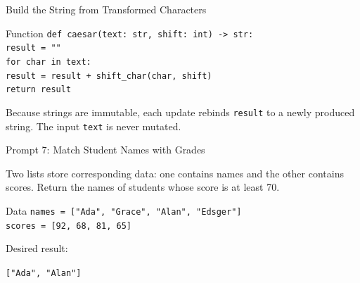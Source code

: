 \documentclass[aspectratio=169,10pt]{beamer}
\begin{document}
\begin{frame}{Build the String from Transformed Characters}
  \begin{block}{Function}
    \texttt{def caesar(text: str, shift: int) -> str:}\\
    \hspace*{0.20in}\texttt{result = ""}\\
    \hspace*{0.20in}\texttt{for char in text:}\\
    \hspace*{0.40in}\texttt{result = result + shift\_char(char, shift)}\\
    \hspace*{0.20in}\texttt{return result}
  \end{block}

  \begin{keyidea}
    Because strings are immutable, each update rebinds \texttt{result} to a newly produced string. The input \texttt{text} is never mutated.
  \end{keyidea}
\end{frame}


\begin{frame}{Prompt 7: Match Student Names with Grades}
  \begin{activity}
    Two lists store corresponding data: one contains names and the other contains scores. Return the names of students whose score is at least 70.
  \end{activity}

  \begin{block}{Data}
    \texttt{names  = ["Ada", "Grace", "Alan", "Edsger"]}\\
    \texttt{scores = [92, 68, 81, 65]}
  \end{block}

  Desired result:
  \begin{center}
    \texttt{["Ada", "Alan"]}
  \end{center}
\end{frame}
\end{document}
